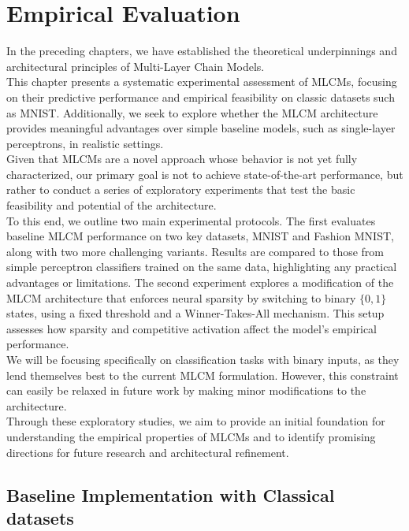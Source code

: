 \documentclass[a4paper,12pt]{report}
\begin{document}
\chapter{Empirical Evaluation}
In the preceding chapters, we have established the theoretical underpinnings and 
architectural principles of Multi-Layer Chain Models. \\
This chapter presents a systematic experimental assessment of MLCMs, focusing on their 
predictive performance and empirical feasibility on classic datasets such as MNIST. 
Additionally, we seek to explore whether the MLCM architecture provides meaningful 
advantages over simple baseline models, such as single-layer perceptrons, in 
realistic settings. \\
Given that MLCMs are a novel approach whose behavior is not yet fully 
characterized, our primary goal is not to achieve state-of-the-art performance, 
but rather to conduct a series of exploratory experiments that test the basic 
feasibility and potential of the architecture. \\
To this end, we outline two main experimental protocols. The first 
evaluates baseline MLCM performance on two key datasets, MNIST and Fashion MNIST, 
along with two more challenging variants. Results are compared to those from simple 
perceptron classifiers trained on the same data, highlighting any practical advantages 
or limitations. The second experiment explores a modification of the MLCM architecture 
that enforces neural sparsity by switching to binary \(\{0,1\}\) states, using a 
fixed threshold and a Winner-Takes-All mechanism. This setup assesses how sparsity 
and competitive activation affect the model's empirical performance. \\
We will be focusing specifically on classification tasks with binary inputs, as they 
lend themselves best to the current MLCM formulation. However, this constraint can 
easily be relaxed in future work by making minor modifications to the architecture. \\
Through these exploratory studies, we aim to provide an initial foundation for 
understanding the empirical properties of MLCMs and to identify promising directions 
for future research and architectural refinement.

\section{Baseline Implementation with Classical datasets}
\end{document}
